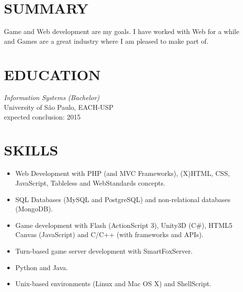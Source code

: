 \documentclass[line,margin]{res}
\begin{document}

\address{Av. Sete de Setembro, 1256 - Guarulhos - São Paulo}
\address{+55 11 999326440 - bruno@croci.me - \href{http://bruno.croci.me/}{http://bruno.croci.me/}}

 
\begin{resume}
 
\section{SUMMARY} Game and Web development are my goals. I have worked with Web for a while and Games are a great industry where I am pleased to make part of.
 
 
\section{EDUCATION} {\sl Information Systems (Bachelor)} \\
                University of São Paulo, EACH-USP \\
                expected conclusion: 2015
                
 
\section{SKILLS} \begin{itemize}  \itemsep -3pt
                 \item Web Development with PHP (and MVC Frameworks), (X)HTML, CSS, JavaScript, 
                       Tableless and WebStandards concepts.
                 \item SQL Databases (MySQL and PostgreSQL) and non-relational databases (MongoDB).
                 \item Game development with Flash (ActionScript 3), Unity3D (C\#),
                       HTML5 Canvas (JavaScript) and C/C++ (with frameworks and APIs).
                 \item Turn-based game server development with SmartFoxServer.
                 \item Python and Java.
                 \item Unix-based environments (Linux and Mac OS X) and ShellScript.
                 \end{itemize}
 

\end{resume}
\end{document}
